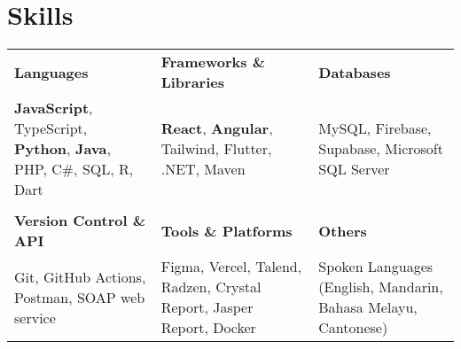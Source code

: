 \documentclass[10pt, letterpaper]{article}
\begin{document}
    \vspace{0.20 cm}


    \section{Skills}

        \vspace{0.2cm}
        
        \begin{center}
            \begin{tabular}{p{} p{} p{}}
            \setlength{\extrarowheight}{4pt} 
            \textbf{Languages} & \textbf{Frameworks \& Libraries} & \textbf{Databases} \\
                \textbf{JavaScript}, TypeScript, \textbf{Python}, \textbf{Java}, PHP, C\#, SQL, R, Dart &
                \textbf{React}, \textbf{Angular}, Tailwind, Flutter, .NET, Maven &
                MySQL, Firebase, Supabase, Microsoft SQL Server \\
            
            \\
            
            \textbf{Version Control \& API} & \textbf{Tools \& Platforms} & \textbf{Others} \\
                Git, GitHub Actions, Postman, SOAP web service &
                Figma, Vercel, Talend, Radzen, Crystal Report, Jasper Report, Docker &
                Spoken Languages (English, Mandarin, Bahasa Melayu, Cantonese) \\
            
            \end{tabular}
        \end{center}

    \vspace{0.20 cm}
\end{document}
